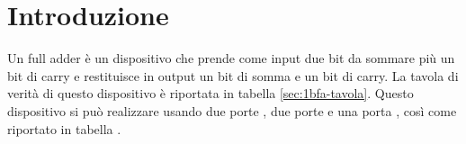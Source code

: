 \section{Introduzione}\label{sec:scopo}
Un full adder è un dispositivo che prende come input due bit da sommare più un bit di carry e restituisce in output
un bit di somma e un bit di carry.
La tavola di verità di questo dispositivo è riportata in tabella \ref{sec:1bfa-tavola}.
Questo dispositivo si può realizzare usando due porte , due porte  e una porta , così come
riportato in tabella .



